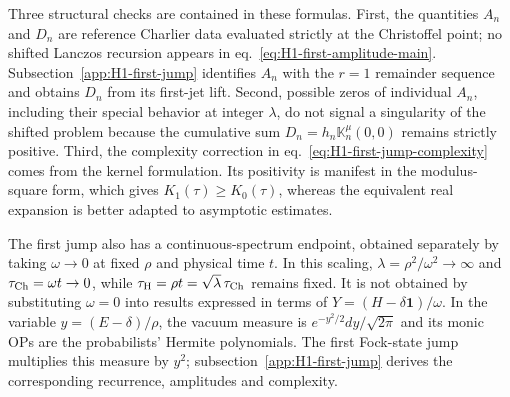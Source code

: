 \documentclass[a4paper,11pt]{article}
\def\dd{d}%
\def\ee{e}%
\theoremstyle{definition}
\theoremstyle{remark}
\newcommand{\dd}{\mathrm d}
\newcommand{\ee}{\mathrm e}
\newcommand{\Id}{\mathbf 1}
\begin{document}
Three structural checks are contained in these formulas. First, the quantities $A_n$ and $D_n$ are reference Charlier data evaluated strictly at the Christoffel point; no shifted Lanczos recursion appears in eq.~\eqref{eq:H1-first-amplitude-main}. Subsection~\ref{app:H1-first-jump} identifies $A_n$ with the $r=1$ remainder sequence and obtains $D_n$ from its first-jet lift. Second, possible zeros of individual $A_n$, including their special behavior at integer $\lambda$, do not signal a singularity of the shifted problem because the cumulative sum
$D_n=h_n\mathbb K_n^\mu(0,0)$ remains strictly positive. Third, the complexity correction in eq.~\eqref{eq:H1-first-jump-complexity} comes from the kernel formulation. Its positivity is manifest in the modulus-square form, which gives $K_{1}(\tau)\ge K_0(\tau)$, whereas the equivalent real expansion is better adapted to asymptotic estimates.

The first jump also has a continuous-spectrum endpoint, obtained separately by taking $\omega\to0$ at fixed $\rho$ and physical time $t$. In this scaling, $\lambda=\rho^2/\omega^2\to\infty$ and $\tau_{\rm Ch}=\omega t\to0$, while $\tau_{\rm H}=\rho t=\sqrt\lambda\,\tau_{\rm Ch}$ remains fixed. It is not obtained by substituting $\omega=0$ into results expressed in terms of $Y=(H-\delta\Id)/\omega$. In the variable $y=(E-\delta)/\rho$, the vacuum measure is $\ee^{-y^2/2}\dd y/\sqrt{2\pi}$ and its monic OPs are the probabilists' Hermite polynomials. The first Fock-state jump multiplies this measure by $y^2$; subsection~\ref{app:H1-first-jump} derives the corresponding recurrence, amplitudes and complexity.
\end{document}
